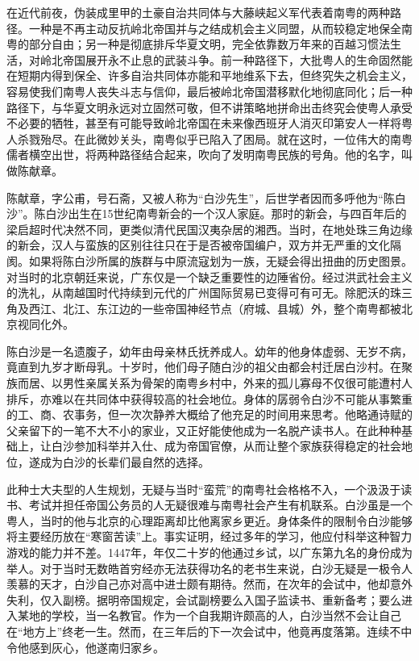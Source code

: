 	

\indent 在近代前夜，伪装成里甲的土豪自治共同体与大藤峡起义军代表着南粤的两种路径。一种是不再主动反抗岭北帝国并与之结成机会主义同盟，从而较稳定地保全南粤的部分自由；另一种是彻底排斥华夏文明，完全依靠数万年来的百越习惯法生活，对岭北帝国展开永不止息的武装斗争。前一种路径下，大批粤人的生命固然能在短期内得到保全、许多自治共同体亦能和平地维系下去，但终究失之机会主义，容易使我们南粤人丧失斗志与信仰，最后被岭北帝国潜移默化地彻底同化；后一种路径下，与华夏文明永远对立固然可敬，但不讲策略地拼命出击终究会使粤人承受不必要的牺牲，甚至有可能导致岭北帝国在未来像西班牙人消灭印第安人一样将粤人杀戮殆尽。在此微妙关头，南粤似乎已陷入了困局。就在这时，一位伟大的南粤儒者横空出世，将两种路径结合起来，吹向了发明南粤民族的号角。他的名字，叫做陈献章。

陈献章，字公甫，号石斋，又被人称为“白沙先生”，后世学者因而多呼他为“陈白沙”。陈白沙出生在15世纪南粤新会的一个汉人家庭。那时的新会，与四百年后的梁启超时代决然不同，更类似清代民国汉夷杂居的湘西。当时，在地处珠三角边缘的新会，汉人与蛮族的区别往往只在于是否被帝国编户，双方并无严重的文化隔阂。如果将陈白沙所属的族群与中原流寇划为一族，无疑会得出扭曲的历史图景。对当时的北京朝廷来说，广东仅是一个缺乏重要性的边陲省份。经过洪武社会主义的洗礼，从南越国时代持续到元代的广州国际贸易已变得可有可无。除肥沃的珠三角及西江、北江、东江边的一些帝国神经节点（府城、县城）外，整个南粤都被北京视同化外。

陈白沙是一名遗腹子，幼年由母亲林氏抚养成人。幼年的他身体虚弱、无岁不病，竟直到九岁才断母乳。十岁时，他们母子随白沙的祖父由都会村迁居白沙村。在聚族而居、以男性亲属关系为骨架的南粤乡村中，外来的孤儿寡母不仅很可能遭村人排斥，亦难以在共同体中获得较高的社会地位。身体的孱弱令白沙不可能从事繁重的工、商、农事务，但一次次静养大概给了他充足的时间用来思考。他略通诗赋的父亲留下的一笔不大不小的家业，又正好能使他成为一名脱产读书人。在此种种基础上，让白沙参加科举并入仕、成为帝国官僚，从而让整个家族获得稳定的社会地位，遂成为白沙的长辈们最自然的选择。

此种士大夫型的人生规划，无疑与当时“蛮荒”的南粤社会格格不入，一个汲汲于读书、考试并担任帝国公务员的人无疑很难与南粤社会产生有机联系。白沙虽是一个粤人，当时的他与北京的心理距离却比他离家乡更近。身体条件的限制令白沙能够将主要经历放在“寒窗苦读”上。事实证明，经过多年的学习，他应付科举这种智力游戏的能力并不差。1447年，年仅二十岁的他通过乡试，以广东第九名的身份成为举人。对于当时无数皓首穷经亦无法获得功名的老书生来说，白沙无疑是一极令人羡慕的天才，白沙自己亦对高中进士颇有期待。然而，在次年的会试中，他却意外失利，仅入副榜。据明帝国规定，会试副榜要么入国子监读书、重新备考；要么进入某地的学校，当一名教官。作为一个自我期许颇高的人，白沙当然不会让自己在“地方上”终老一生。然而，在三年后的下一次会试中，他竟再度落第。连续不中令他感到灰心，他遂南归家乡。

